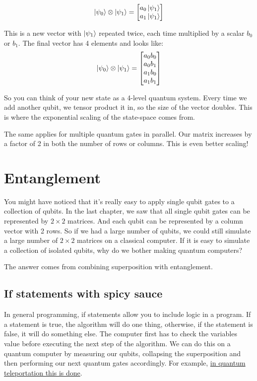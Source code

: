 \documentclass{book}
\begin{document}
$$
 \ket{\psi_0} \otimes \ket{\psi_1} = \begin{bmatrix} a_0\ket{\psi_1} \\ a_1\ket{\psi_1} \end{bmatrix}
$$

This is a new vector with $\ket{\psi_1}$ repeated twice, each time multiplied by a scalar $b_0$ or $b_1$. The final vector has 4 elements and looks like: 
$$
 \ket{\psi_0} \otimes \ket{\psi_1} = \begin{bmatrix} a_0 b_0 \\ a_0 b_1 \\ a_1b_0 \\ a_1 b_1 \end{bmatrix}
$$

So you can think of your new state as a 4-level quantum system. Every time we add another qubit, we tensor product it in, so the size of the vector doubles. This is where the exponential scaling of the state-space comes from.

The same applies for multiple quantum gates in parallel. Our matrix increases by a factor of 2 in both the number of rows or columns. This is even better scaling!

\section{ Entanglement } 

You might have noticed that it's really easy to apply single qubit gates to a collection of qubits. In the last chapter, we saw that all single qubit gates can be represented by $ 2 \times 2$ matrices. And each qubit can be represented by a column vector with 2 rows. So if we had a large number of qubits, we could still simulate a large number of $2 \times 2$ matrices on a classical computer. If it is easy to simulate a collection of isolated qubits, why do we bother making quantum computers? 

The answer comes from combining superposition with entanglement. 


\subsection{ If statements with spicy sauce }

In general programming, if statements allow you to include logic in a program. If a statement is true, the algorithm will do one thing, otherwise, if the statement is false, it will do something else. The computer first has to check the variables value before executing the next step of the algorithm. We can do this on a quantum computer by measuring our qubits, collapsing the superposition and then performing our next quantum gates accordingly. For example, \href{https://qiskit.org/textbook/ch-algorithms/teleportation.html}{in quantum teleportation this is done}. 
\end{document}
